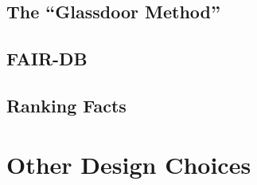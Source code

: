 \subsection{The ``Glassdoor Method''}
\subsection{FAIR-DB}
\subsection{Ranking Facts}


\section{Other Design Choices}


\iffalse

\note{Figures and tables}{You are an engineer, and using figures (illustrations) and tables to better convey your ideas should be an obvious practice you should have learned throughout your university career. If not, it's time now. Use illustrations, screen shots, sketches, and so on to help the reader understand. Use tables to summarize complex text (for example, a profound analysis of the state of the art) or to format data in a readable fashion. Each time you use a figure or table, you must also (i) complement it with a so-called caption (a text right underneath or above it) to give it a title and a description and (ii) reference it from within the main text (never just place a figure somewhere without talking about it). If you use Latex, check your Latex documentation for how to use captions and references.}

\fi
